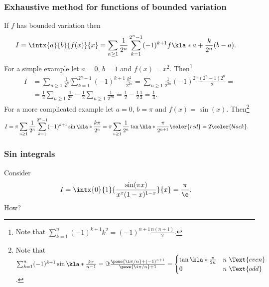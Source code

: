 \documentclass[english, parskip=full]{scrartcl}
\newcommand{\TODO}[1]{\color{red} #1 \color{black}}
\begin{document}
\subsubsection{Exhaustive method for functions of bounded variation}
If $f$ has bounded variation then
\begin{align}
I &= \intx{a}{b}{ f(x)}{x} = \sum_{n\ge 1} \frac{1}{2^n} \sum_{k=1}^{2^n-1} (-1)^{k+1} f \kla*{a + \frac{k}{2^n}(b-a)}. \label{eqn:exhaustive method f of x from a to b}
\end{align}
For a simple example let $a=0$, $b=1$ and $f(x) = x^2$.
Then\footnote{Note that $\sum_{k=1}^n (-1)^{k+1} k^2 = (-1)^{n+1} \frac{n(n+1)}{2} $.}
\begin{align}
I &= \sum_{n\ge 1} \frac{1}{2^n} \sum_{k=1}^{2^n - 1} (-1)^{k+1} \frac{k^2}{2^{2n}} = \sum_{n\ge 1} \frac{1}{2^{3n}} (-1)^{2^n} \frac{(2^n - 1) 2^n}{2} = \\
&= \frac{1}{2} \sum_{n\ge 1} \frac{1}{2^n} - \frac{1}{2} \sum_{n\ge 1} \frac{1}{2^{2n}} = \frac{1}{2} - \frac{1}{2} \frac{1}{3} = \frac{1}{3}.
\end{align}
For a more complicated example let $a=0$, $b=\pi$ and $f(x) = \sin(x)$.
Then\footnote{Note that $\sum_{k=1}^n (-1)^{k+1} \sin \kla*{\frac{k\pi}{n-1}} = \Im \frac{\powe{\i \pi / n} + (-1)^{n+1}}{\powe{\i \pi / n} + 1} = \begin{cases} \tan\kla*{\frac{\pi}{2n}} & n\ \Text{even} \\ 0 & n\ \Text{odd} \end{cases}$.}
\begin{align}
I &= \pi \sum_{n\ge 1} \frac{1}{2^n} \sum_{k=1}^{2^n - 1} (-1)^{k+1} \sin\kla*{\frac{k\pi}{2^n} } = \pi\sum_{n\ge 1} \frac{1}{2^n} \tan\kla*{\frac{\pi}{2^{n+1}}} \TODO{=2} .
\end{align}
\subsubsection{Sin integrals}
Consider
\begin{align}
I &= \intx{0}{1}{\frac{\sin(\pi x)}{x^x (1-x)^{1-x}}}{x} = \frac{\pi}{\e}. \label{eqn:sin pi x over x to x times 1 minus x to 1 minus x}
\end{align}
\TODO{How?}
\end{document}
